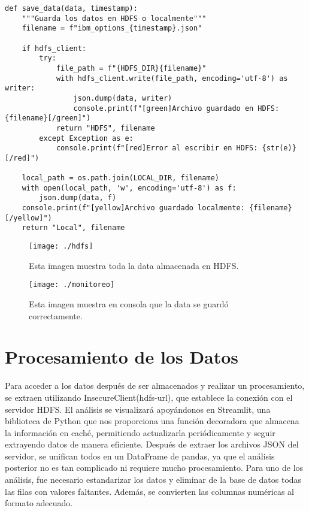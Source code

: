 \documentclass{article}
\begin{document}
	\begin{lstlisting}[style=python]
def save_data(data, timestamp):
	"""Guarda los datos en HDFS o localmente"""
	filename = f"ibm_options_{timestamp}.json"
			
	if hdfs_client:
	  	try:
			file_path = f"{HDFS_DIR}{filename}"
			with hdfs_client.write(file_path, encoding='utf-8') as writer:
				json.dump(data, writer)
				console.print(f"[green]Archivo guardado en HDFS: {filename}[/green]")
			return "HDFS", filename
		except Exception as e:
			console.print(f"[red]Error al escribir en HDFS: {str(e)}[/red]")
			
	local_path = os.path.join(LOCAL_DIR, filename)
	with open(local_path, 'w', encoding='utf-8') as f:
		json.dump(data, f)
	console.print(f"[yellow]Archivo guardado localmente: {filename}[/yellow]")
	return "Local", filename
		\end{lstlisting}
		
		\begin{figure}[h]
			\centering
			\texttt{[image: ./hdfs]}
			\caption{Esta imagen muestra toda la data almacenada en HDFS.}
			\label{fig:mi_imagen}
		
	\end{figure}
			\begin{figure}[h]
		\texttt{[image: ./monitoreo]}
		\caption{Esta imagen muestra en consola que la data se guardó correctamente.}
		\label{fig:mi_imagen}
	\end{figure}
	
	\section{Procesamiento de los Datos}
Para acceder a los datos después de ser almacenados y realizar un procesamiento, se extraen utilizando InsecureClient(hdfs-url), que establece la conexión con el servidor HDFS. El análisis se visualizará apoyándonos en Streamlit, una biblioteca de Python que nos proporciona una función decoradora que almacena la información en caché, permitiendo actualizarla periódicamente y seguir extrayendo datos de manera eficiente. Después de extraer los archivos JSON del servidor, se unifican todos en un DataFrame de pandas, ya que el análisis posterior no es tan complicado ni requiere mucho procesamiento. Para uno de los análisis, fue necesario estandarizar los datos y eliminar de la base de datos todas las filas con valores faltantes. Además, se convierten las columnas numéricas al formato adecuado.
\end{document}

